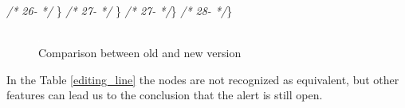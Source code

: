 \documentclass[
]{article}
\newenvironment{Shaded}{\begin{snugshade}}{\end{snugshade}}
\newcommand{\CommentTok}[1]{\textcolor[rgb]{0.56,0.35,0.01}{\textit{#1}}}
\newcommand{\NormalTok}[1]{#1}
\begin{document}
\begin{landscape}
\begin{Shaded}
\begin{Highlighting}[]
\CommentTok{/* 26-                 */}\NormalTok{     \}                                                         }\CommentTok{/* 27-                 */}\NormalTok{     \}                                                         }
\CommentTok{/* 27-                 */}\NormalTok{\}                                                              }\CommentTok{/* 28-                 */}\NormalTok{\}                                                              }
\end{Highlighting}
\end{Shaded}

\normalsize

\begin{figure}
\centering
\includegraphics{figures/fake.png}
\caption{Comparison between old and new version
\label{comparison_editing_line}}
\end{figure}

\end{landscape}

\newpage

In the Table \ref{editing_line} the nodes are not recognized as
equivalent, but other features can lead us to the conclusion that the
alert is still open.

\small
\end{document}
